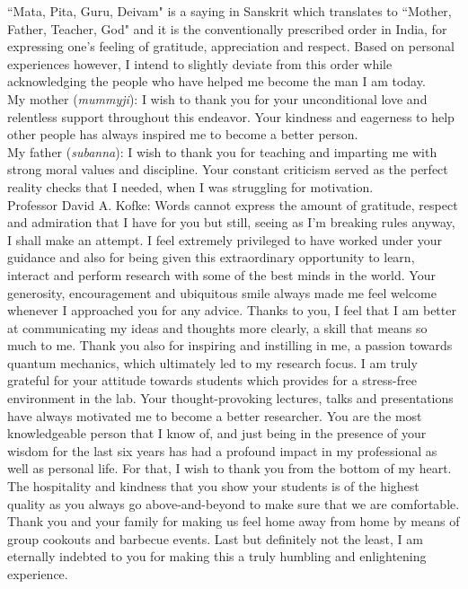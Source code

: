 ``Mata, Pita, Guru, Deivam" is a saying in Sanskrit which translates to ``Mother, Father, Teacher, God" and it is the conventionally prescribed order in India, for expressing one's feeling of gratitude, appreciation and respect. Based on personal experiences however, I intend to slightly deviate from this order while acknowledging the people who have helped me become the man I am today.\\

\noindent My mother (\emph{mummyji}): I wish to thank you for your unconditional love and relentless support throughout this endeavor. Your kindness and eagerness to help other people has always inspired me to become a better person.\\

\noindent My father (\emph{subanna}): I wish to thank you for teaching and imparting me with strong moral values and discipline. Your constant criticism served as the perfect reality checks that I needed, when I was struggling for motivation.\\

\noindent Professor David A. Kofke: Words cannot express the amount of gratitude, respect and admiration that I have for you but still, seeing as I'm breaking rules anyway, I shall make an attempt. I feel extremely privileged to have worked under your guidance and also for being given this extraordinary opportunity to learn, interact and perform research with some of the best minds in the world. Your generosity, encouragement and ubiquitous smile always made me feel welcome whenever I approached you for any advice. Thanks to you, I feel that I am better at communicating my ideas and thoughts more clearly, a skill that means so much to me. Thank you also for inspiring and instilling in me, a passion towards quantum mechanics, which ultimately led to my research focus. I am truly grateful for your attitude towards students which provides for a stress-free environment in the lab. Your thought-provoking lectures, talks and presentations have always motivated me to become a better researcher. You are the most knowledgeable person that I know of, and just being in the presence of your wisdom for the last six years has had a profound impact in my professional as well as personal life. For that, I wish to thank you from the bottom of my heart. The hospitality and kindness that you show your students is of the highest quality as you always go above-and-beyond to make sure that we are comfortable. Thank you and your family for making us feel home away from home by means of group cookouts and barbecue events. Last but definitely not the least, I am eternally indebted to you for making this a truly humbling and enlightening experience.\\

